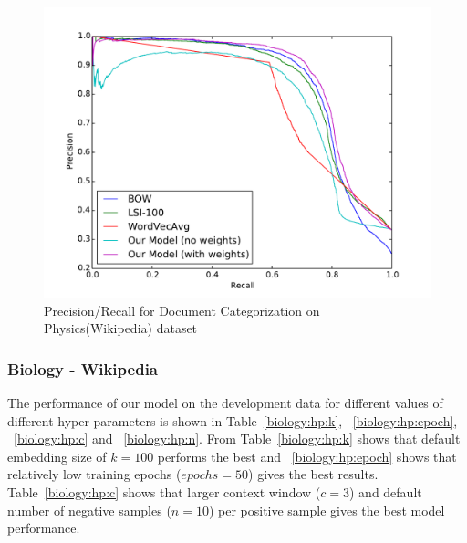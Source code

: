 \begin{figure}[tb]
\centering
        \includegraphics[width=0.8\columnwidth]{figs/pr/physics-cs.pdf}
    \caption{\footnotesize Precision/Recall for Document Categorization on Physics(Wikipedia) dataset}
    \label{fig:pr:physics:cs} 
\end{figure}

\subsubsection{Biology - Wikipedia}
The performance of our model on the development data for different values of different hyper-parameters is shown in Table~\ref{biology:hp:k}, ~\ref{biology:hp:epoch}, ~\ref{biology:hp:c} and ~\ref{biology:hp:n}. From Table~\ref{biology:hp:k} shows that default embedding size of $k = 100$ performs the best and ~\ref{biology:hp:epoch} shows that relatively low training epochs ($epochs = 50$) gives the best results. Table~\ref{biology:hp:c} shows that larger context window ($c = 3$) and default number of negative samples ($n = 10$) per positive sample gives the best model performance. 

